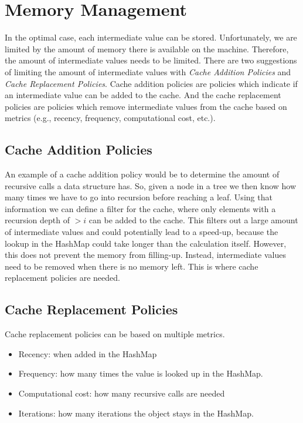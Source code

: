 \section{Memory Management}

In the optimal case, each intermediate value can be stored. Unfortunately, we are limited by the amount of memory there is available on the machine. Therefore, the amount of intermediate values needs to be limited. There are two suggestions of limiting the amount of intermediate values with \textit{Cache Addition Policies} and \textit{Cache Replacement Policies}. Cache addition policies are policies which indicate if an intermediate value can be added to the cache. And the cache replacement policies are policies which remove intermediate values from the cache based on metrics (e.g., recency, frequency, computational cost, etc.). 

\subsection{Cache Addition Policies}


An example of a cache addition policy would be to determine the amount of recursive calls a data structure has. So, given a node in a tree we then know how many times we have to go into recursion before reaching a leaf. Using that information we can define a filter for the cache, where only elements with a recursion depth of $>i$ can be added to the cache. This filters out a large amount of intermediate values and could potentially lead to a speed-up, because the lookup in the HashMap could take longer than the calculation itself. However, this does not prevent the memory from filling-up. 
Instead, intermediate values need to be removed when there is no memory left. This is where cache replacement policies are needed.

\subsection{Cache Replacement Policies}

Cache replacement policies can be based on multiple metrics. 
\begin{itemize}
  \item Recency: when added in the HashMap
  \item Frequency: how many times the value is looked up in the HashMap.
  \item Computational cost: how many recursive calls are needed
  \item Iterations: how many iterations the object stays in the HashMap.
\end{itemize}

